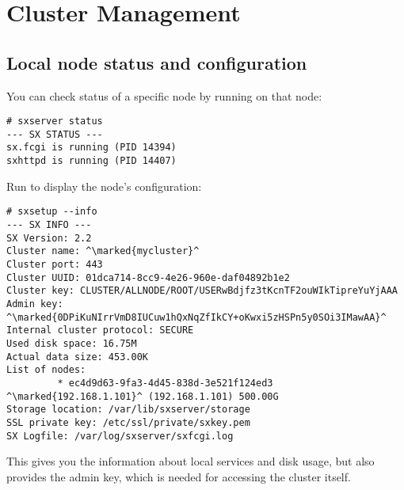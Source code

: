 \chapter{Cluster Management}

\section{Local node status and configuration}
You can check status of a specific node by running  on
that node:
\begin{lstlisting}
# sxserver status
--- SX STATUS ---
sx.fcgi is running (PID 14394)
sxhttpd is running (PID 14407)
\end{lstlisting}
Run  to display the node's configuration:
\begin{lstlisting}
# sxsetup --info
--- SX INFO ---
SX Version: 2.2
Cluster name: ^\marked{mycluster}^
Cluster port: 443
Cluster UUID: 01dca714-8cc9-4e26-960e-daf04892b1e2
Cluster key: CLUSTER/ALLNODE/ROOT/USERwBdjfz3tKcnTF2ouWIkTipreYuYjAAA
Admin key: ^\marked{0DPiKuNIrrVmD8IUCuw1hQxNqZfIkCY+oKwxi5zHSPn5y0SOi3IMawAA}^
Internal cluster protocol: SECURE
Used disk space: 16.75M
Actual data size: 453.00K
List of nodes:
         * ec4d9d63-9fa3-4d45-838d-3e521f124ed3 ^\marked{192.168.1.101}^ (192.168.1.101) 500.00G
Storage location: /var/lib/sxserver/storage
SSL private key: /etc/ssl/private/sxkey.pem
SX Logfile: /var/log/sxserver/sxfcgi.log
\end{lstlisting}
This gives you the information about local services and disk usage, but
also provides the admin key, which is needed for accessing the cluster
itself.

